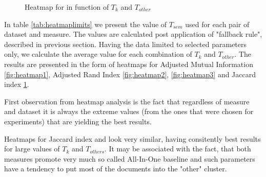\documentclass[a4paper, 12pt, oneside]{Thesis} %
\begin{document}
\begin{figure}[!htbp]
  \centering
  \hfill
  \hfill
  \caption{Heatmap for  in function of $T_k$ and $T_{other}$}
  \label{fig:heatmap4}
\end{figure}

In table \ref{tab:heatmaplimits} we present the value of $T_{sem}$ used for each pair of dataset and measure. The values are calculated post application of "fallback rule", described in previous section. Having the data limited to selected parameters only, we calculate the average value for each combination of $T_k$ and $T_{other}$. The results are presented in the form of heatmaps for Adjusted Mutual Information \ref{fig:heatmap1}, Adjusted Rand Index \ref{fig:heatmap2},  \ref{fig:heatmap3} and Jaccard index \ref{fig:heatmap4}.

First observation from heatmap analysis is the fact that regardless of measure and dataset it is always the extreme values (from the ones that were chosen for experiments) that are yielding the best results.

Heatmaps for Jaccard index and  look very similar, having consitently best results for large values of $T_k$ and $T_{others}$. It may be associated with the fact, that both measures promote very much so called All-In-One baseline and such parameters have a tendency to put most of the documents into the "other" cluster.
\end{document}
